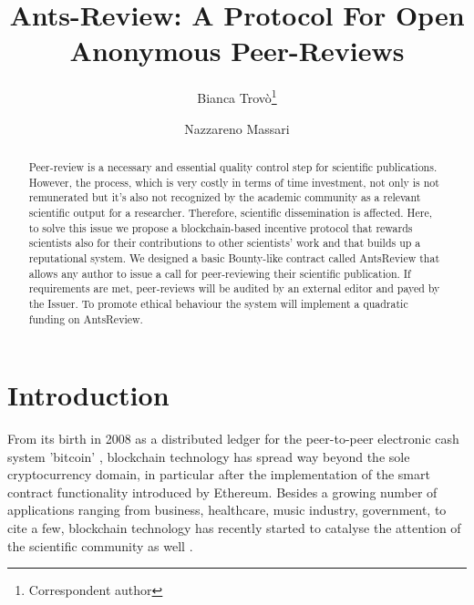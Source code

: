 \documentclass[runningheads]{llncs}
\begin{document}
%
\title{Ants-Review: A Protocol For Open Anonymous Peer-Reviews}
%
%
\author{Bianca Trovò\thanks{Correspondent author} \and
Nazzareno Massari}
%
%
%
\maketitle              %
%
\begin{abstract}
Peer-review is a necessary and essential quality control step for scientific publications. However, the process, which is very costly in terms of time investment, not only is not remunerated but it’s also not recognized by the academic community as a relevant scientific output for a researcher. Therefore, scientific dissemination is affected. Here, to solve this issue we propose a blockchain-based incentive protocol that rewards scientists also for their contributions to other scientists’ work and that builds up a reputational system. We designed a basic Bounty-like contract called AntsReview that allows any author to issue a call for peer-reviewing their scientific publication. If requirements are met, peer-reviews will be audited by an external editor and payed by the Issuer. To promote ethical behaviour the system will implement a quadratic funding on AntsReview.
\end{abstract}
%
%
\section{Introduction}
From its birth in 2008 as a distributed ledger for the peer-to-peer electronic cash system 'bitcoin' \cite{Bitcoin}, blockchain technology has spread way beyond the sole cryptocurrency domain, in particular after the implementation of the smart contract functionality introduced by Ethereum. 
Besides a growing number of applications ranging from business, healthcare, music industry, government, to cite a few, blockchain technology has recently started to catalyse the attention of the scientific community as well \cite{Bitcoin-Nature-focus,vanRossum2017-DigSci}.
\end{document}
